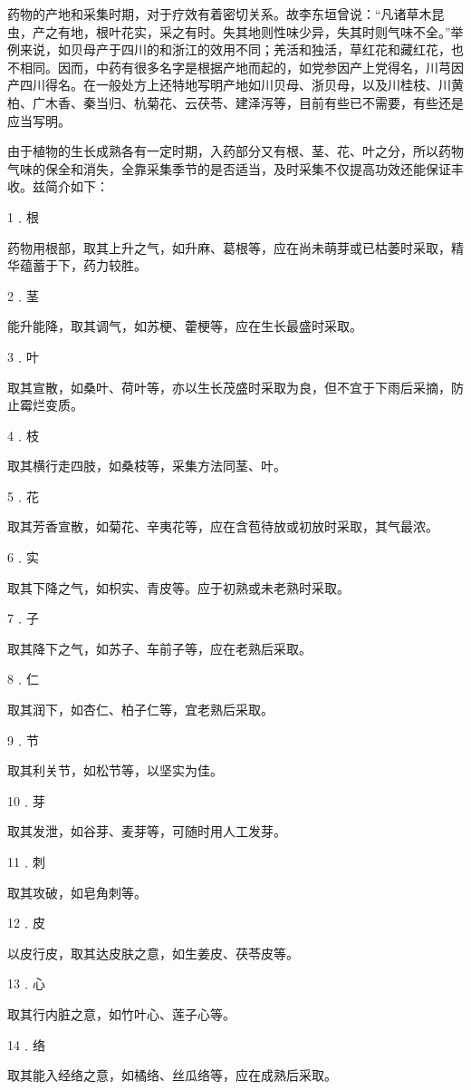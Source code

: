\documentclass[12pt,UTF8]{ctexbook}
\begin{document}
药物的产地和采集时期，对于疗效有着密切关系。故李东垣曾说：“凡诸草木昆虫，产之有地，根叶花实，采之有时。失其地则性味少异，失其时则气味不全。”举例来说，如贝母产于四川的和浙江的效用不同；羌活和独活，草红花和藏红花，也不相同。因而，中药有很多名字是根据产地而起的，如党参因产上党得名，川芎因产四川得名。在一般处方上还特地写明产地如川贝母、浙贝母，以及川桂枝、川黄柏、广木香、秦当归、杭菊花、云茯苓、建泽泻等，目前有些已不需要，有些还是应当写明。

由于植物的生长成熟各有一定时期，入药部分又有根、茎、花、叶之分，所以药物气味的保全和消失，全靠采集季节的是否适当，及时采集不仅提高功效还能保证丰收。兹简介如下：

1﹒根

药物用根部，取其上升之气，如升麻、葛根等，应在尚未萌芽或已枯萎时采取，精华蕴蓄于下，药力较胜。

2﹒茎

能升能降，取其调气，如苏梗、藿梗等，应在生长最盛时采取。

3﹒叶

取其宣散，如桑叶、荷叶等，亦以生长茂盛时采取为良，但不宜于下雨后采摘，防止霉烂变质。

4﹒枝

取其横行走四肢，如桑枝等，采集方法同茎、叶。

5﹒花

取其芳香宣散，如菊花、辛夷花等，应在含苞待放或初放时采取，其气最浓。

6﹒实

取其下降之气，如枳实、青皮等。应于初熟或未老熟时采取。

7﹒子

取其降下之气，如苏子、车前子等，应在老熟后采取。

8﹒仁

取其润下，如杏仁、柏子仁等，宜老熟后采取。

9﹒节

取其利关节，如松节等，以坚实为佳。

10﹒芽

取其发泄，如谷芽、麦芽等，可随时用人工发芽。

11﹒刺

取其攻破，如皂角刺等。

12﹒皮

以皮行皮，取其达皮肤之意，如生姜皮、茯苓皮等。

13﹒心

取其行内脏之意，如竹叶心、莲子心等。

14﹒络

取其能入经络之意，如橘络、丝瓜络等，应在成熟后采取。
\end{document}
